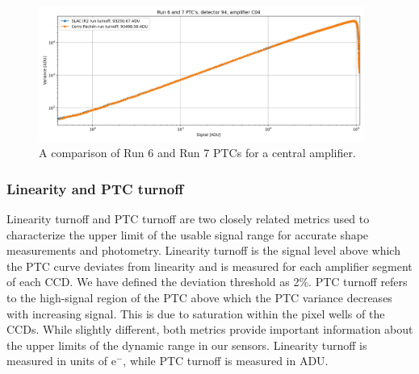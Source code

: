 \begin{figure}[H]
\begin{centering}
\includegraphics[width=0.95\textwidth]{figures/baselineCharacterization/run7PTCsToDate.jpg}
\caption{A comparison of Run 6 and Run 7 PTCs for a central amplifier.}
\end{centering}
\end{figure}

\subsubsection{Linearity and PTC turnoff}\label{linearity-and-ptc-turnoff}

Linearity turnoff and PTC turnoff are two closely related metrics used
to characterize the upper limit of the usable signal range for accurate shape measurements and photometry. Linearity turnoff is the signal level above which the PTC curve deviates from
linearity and is measured for each amplifier segment of each CCD. We have defined the deviation threshold as 2\%.
PTC turnoff refers to the high-signal region of the PTC above which the PTC
variance decreases with increasing signal. This is due to saturation within the pixel wells of the CCDs. While slightly different, both metrics
provide important information about the upper limits of the dynamic
range in our sensors. Linearity turnoff is measured in units of e$^-$,
while PTC turnoff is measured in ADU.

